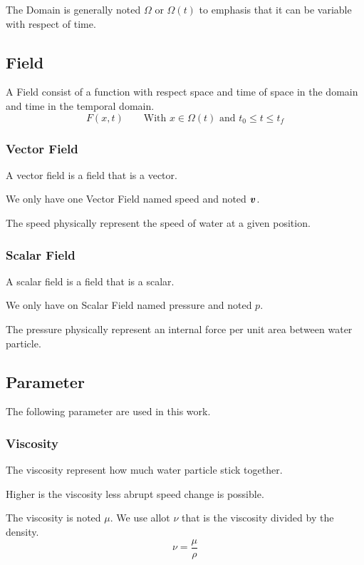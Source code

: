 The Domain is generally noted $\Omega$ or $\Omega(t)$ to emphasis that it can be variable with respect of time.

\subsection{Field}

A Field consist of a function with respect space and time of space in the domain and time in the temporal domain.
\begin{equation}
 F(x,t)\qquad \text{With $x\in\Omega(t)$ and $t_0\leq t \leq t_f$}
\end{equation}

\subsubsection{Vector Field}
A vector field is a field that is a vector.

We only have one Vector Field named speed and noted ${\boldsymbol {v}}$.

The speed physically represent the speed of water at a given position.
\subsubsection{Scalar Field}
A scalar field is a field that is a scalar.

We only have on Scalar Field named pressure and noted $p$.

The pressure physically represent an internal force per unit area between water particle.

\subsection{Parameter}

The following parameter are used in this work.

\subsubsection{Viscosity}
The viscosity represent how much water particle stick together.

Higher is the viscosity less abrupt speed change is possible.

The viscosity is noted $\mu$. We use allot $\nu$ that is the viscosity divided by the density.
\begin{equation}
 \nu=\frac{\mu}{\rho}
\end{equation}


